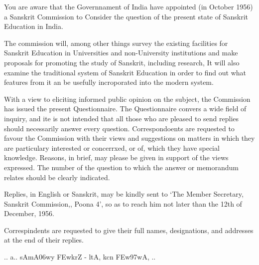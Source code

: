 \newpage

{\rm 
You are aware that the Governnament of India have appointed (in October 1956) a Sanskrit Commission to Consider the question of the present state of Sanskrit Education in India.

The commission will, among other things survey the existing facilities for Sanskrit Education in Universities and non-University institutions and make proposals for promoting the study of Sanskrit, including research, It will also examine the traditional system of Sanskrit Education in order to find out what features from it an be usefully incroporated into the modern system.


With a view to eliciting informed public opinion on the subject, the Commission has issued the present Questionnaire. The Questionnaire convers a wide field of inquiry, and ite is not intended that all those who are pleased to send replies should necessarily answer every question. Correspondoents are requested to favour the Commission with their views and suggestions on matters in which they are particulary interested or concerrxed, or of, which they have special knowledge. Reasons, in brief, may please be given in support of the views expressed. The number of the question to which the answer or memorandum relates should be clearly indicated.

Replies, in English or Sanskrit, may be kindly sent to `The Member Secretary, Sanskrit Commission,, Poona 4', so as to reach him not later than the 12th of December, 1956. 

Correspindents are requested to give their full names, designations, and addresses at the end of their replies.
}

\newpage

{\dn .. a.. sAmA\306wy \3FEwkrZ {\rs -\re} ltA, k\?cn \3FEw\397wA, ..}

